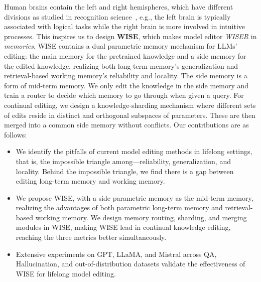 \documentclass{article}
\begin{document}
Human brains contain the left and right hemispheres, which have different divisions as studied in recognition science~\cite{brain_division_1,brain_division_2}, e.g., the left brain is typically associated with logical tasks while the right brain is more involved in intuitive processes. This inspires us to design \textbf{WISE}, which makes model editor \textit{WISER} in \textit{memories}. WISE contains a dual parametric memory mechanism for LLMs' editing: the main memory for the pretrained knowledge and a side memory for the edited knowledge, realizing both long-term memory's generalization and retrieval-based working memory's reliability and locality. The side memory is a form of mid-term memory. 
We only edit the knowledge in the side memory and train a router to decide which memory to go through when given a query. 
For continual editing, we design a knowledge-sharding mechanism where different sets of edits reside in distinct and orthogonal subspaces of parameters. These are then merged into a common side memory without conflicts.
Our contributions are as follows:
\begin{itemize}[leftmargin=*,nosep]
    \item We identify the pitfalls of current model editing methods in lifelong settings, that is, the impossible triangle among---reliability, generalization, and locality. Behind the impossible triangle, we find there is a gap between editing long-term memory and working memory.
    \item We propose WISE, with a side parametric memory as the mid-term memory, realizing the advantages of both parametric long-term memory and retrieval-based working memory. We design memory routing, sharding, and merging modules in WISE, making WISE lead in continual knowledge editing, reaching the three metrics better simultaneously.
    \item Extensive experiments on GPT, LLaMA, and Mistral across QA, Hallucination,  and out-of-distribution datasets validate the effectiveness of WISE for lifelong model editing.
\end{itemize}






\end{document}
